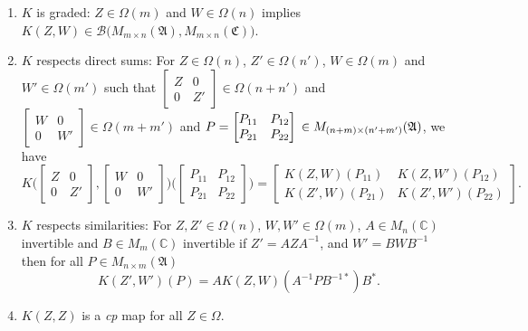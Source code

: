 \documentclass[12pt]{amsart}%
\numberwithin{equation}{section}
\newcommand{\cB}{\mathcal{B}}
\newcommand{\fA}{{\mathfrak{A}}}
\newcommand{\fC}{{\mathfrak{C}}}
\newcommand{\C}{\mathbb{C}}
\begin{document}
\begin{enumerate}
    \item $K$ is graded: $Z\in\Omega(m)$ and $W\in\Omega(n)$ implies $K(Z,W)\in \cB\big(M_{m\times n}(\fA),M_{m\times n}(\fC)\big)$.

    \item $K$ respects direct sums: For $Z\in\Omega(n)$, $Z'\in\Omega(n')$, $W\in\Omega(m)$ and $W'\in\Omega(m')$ such that $\begin{bmatrix}
        Z & 0\\
        0 & Z'
    \end{bmatrix}\in\Omega(n+n')$ and $\begin{bmatrix}
        W & 0\\
        0 & W'
    \end{bmatrix}\in\Omega(m+m')$ and $P=\begin{bmatrix}
        P_{11} & P_{12}\\
        P_{21} & P_{22}
    \end{bmatrix}\\\in M_{(n+m)\times (n'+m')}(\fA)$, we have
    \[
    K\bigg(\begin{bmatrix}
        Z & 0\\
        0 & Z'
    \end{bmatrix},\begin{bmatrix}
        W & 0\\
        0 & W'
    \end{bmatrix}\bigg)\bigg(\begin{bmatrix}
        P_{11} & P_{12}\\
        P_{21} & P_{22}
    \end{bmatrix}\bigg)=\begin{bmatrix}
        K(Z,W)(P_{11}) & K(Z,W')(P_{12})\\
        K(Z',W)(P_{21}) & K(Z',W')(P_{22})
    \end{bmatrix}.
    \]
    \item $K$ respects similarities: For $Z,Z'\in\Omega(n)$, $W,W'\in\Omega(m)$, $A\in M_n(\C)$ invertible and $B\in M_m(\C)$ invertible if $Z'=AZA^{-1}$, and $W'=BWB^{-1}$ then for all $P\in M_{n\times m}(\fA)$
    \[
    K(Z',W')(P)=AK(Z,W)(A^{-1}PB^{-1*})B^*.
    \]
    \item $K(Z,Z)$ is a \textit{cp} map for all $Z\in\Omega$. 
\end{enumerate} 
\end{document}
